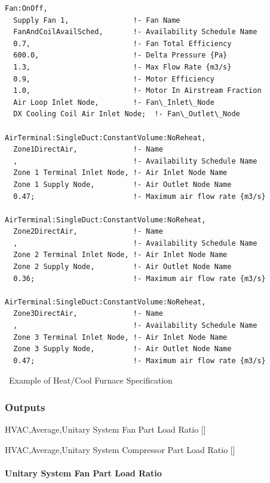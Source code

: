 \begin{lstlisting}
Fan:OnOff,
  Supply Fan 1,               !- Fan Name
  FanAndCoilAvailSched,       !- Availability Schedule Name
  0.7,                        !- Fan Total Efficiency
  600.0,                      !- Delta Pressure {Pa}
  1.3,                        !- Max Flow Rate {m3/s}
  0.9,                        !- Motor Efficiency
  1.0,                        !- Motor In Airstream Fraction
  Air Loop Inlet Node,        !- Fan\_Inlet\_Node
  DX Cooling Coil Air Inlet Node;  !- Fan\_Outlet\_Node

AirTerminal:SingleDuct:ConstantVolume:NoReheat,
  Zone1DirectAir,             !- Name
  ,                           !- Availability Schedule Name
  Zone 1 Terminal Inlet Node, !- Air Inlet Node Name
  Zone 1 Supply Node,         !- Air Outlet Node Name
  0.47;                       !- Maximum air flow rate {m3/s}

AirTerminal:SingleDuct:ConstantVolume:NoReheat,
  Zone2DirectAir,             !- Name
  ,                           !- Availability Schedule Name
  Zone 2 Terminal Inlet Node, !- Air Inlet Node Name
  Zone 2 Supply Node,         !- Air Outlet Node Name
  0.36;                       !- Maximum air flow rate {m3/s}

AirTerminal:SingleDuct:ConstantVolume:NoReheat,
  Zone3DirectAir,             !- Name
  ,                           !- Availability Schedule Name
  Zone 3 Terminal Inlet Node, !- Air Inlet Node Name
  Zone 3 Supply Node,         !- Air Outlet Node Name
  0.47;                       !- Maximum air flow rate {m3/s}
\end{lstlisting}

~Example of Heat/Cool Furnace Specification

\subsubsection{Outputs}\label{outputs-1-029}

HVAC,Average,Unitary System Fan Part Load Ratio {[]}

HVAC,Average,Unitary System Compressor Part Load Ratio {[]}

\paragraph{Unitary System Fan Part Load Ratio}\label{unitary-system-fan-part-load-ratio-1}

